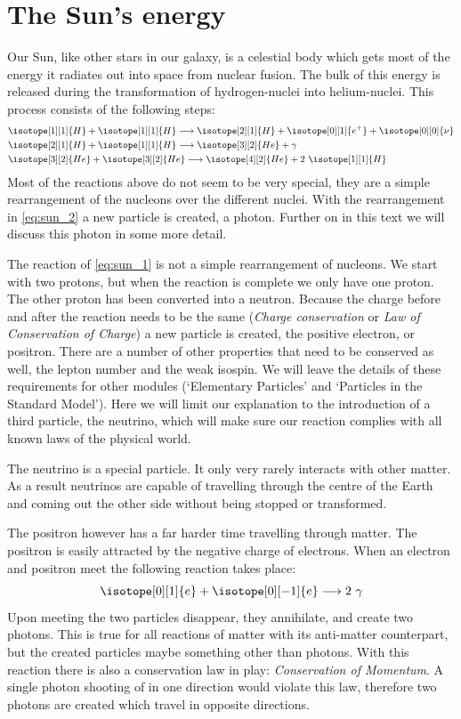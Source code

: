 \documentclass[12pt,a4paper]{article}
\numberwithin{equation}{section}
\numberwithin{figure}{section}
\numberwithin{table}{section}
\begin{document}
\section{The Sun's energy}
Our Sun, like other stars in our galaxy, is a celestial body which gets most of the energy it radiates out into space from nuclear fusion. The bulk of this energy is released during the transformation of hydrogen-nuclei into helium-nuclei. This process consists of the following steps:
\begin{align}
& \isotope[1][1]{H} +\isotope[1][1]{H} \longrightarrow \isotope[2][1]{H} + \isotope[0][1]{e^+} + \isotope[0][0]{\nu} \label{eq:sun_1}\\
& \isotope[2][1]{H} + \isotope[1][1]{H}\longrightarrow \isotope[3][2]{He} + \gamma \label{eq:sun_2}\\
& \isotope[3][2]{He} + \isotope[3][2]{He} \longrightarrow \isotope[4][2]{He} + 2~\isotope[1][1]{H} \label{eq:sun_3}
\end{align}
Most of the reactions above do not seem to be very special, they are a simple rearrangement of the nucleons over the different nuclei. With the rearrangement in \ref{eq:sun_2} a new particle is created, a photon. Further on in this text we will discuss this photon in some more detail.

The reaction of \ref{eq:sun_1} is not a simple rearrangement of nucleons. We start with two protons, but when the reaction is complete we only have one proton. The other proton has been converted into a neutron. Because the charge before and after the reaction needs to be the same (\textit{Charge conservation} or \textit{Law of Conservation of Charge}) a new particle is created, the positive electron, or positron. There are a number of other properties that need to be conserved as well, the lepton number and the weak isospin. We will leave the details of these requirements for other modules (`Elementary Particles' and `Particles in the Standard Model'). Here we will limit our explanation to the introduction of a third particle, the neutrino, which will make sure our reaction complies with all known laws of the physical world.

The neutrino is a special particle. It only very rarely interacts with other matter. As a result neutrinos are capable of travelling through the centre of the Earth and coming out the other side without being stopped or transformed.

The positron however has a far harder time travelling through matter. The positron is easily attracted by the negative charge of electrons. When an electron and positron meet the following reaction takes place:
\begin{equation}
\isotope[0][1]{e} + \isotope[0][-1]{e}  \longrightarrow 2~\gamma
\end{equation}
Upon meeting the two particles disappear, they annihilate, and create two photons. This is true for all reactions of matter with its anti-matter counterpart, but the created particles maybe something other than photons. With this reaction there is also a conservation law in play: \textit{Conservation of Momentum}. A single photon shooting of in one direction would violate this law, therefore two photons are created which travel in opposite directions.
\end{document}
